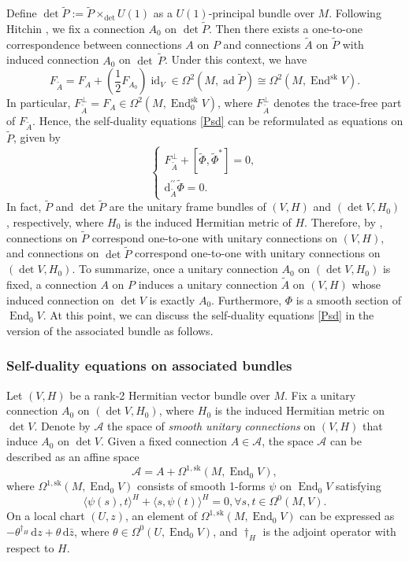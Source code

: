 \documentclass[a4paper]{amsart}
\theoremstyle{definition}
\theoremstyle{remark}
\numberwithin{equation}{section}
\begin{document}
Define $\det \tilde{P} := \tilde P \times_{\det} U(1)$ as a $U(1)$-principal bundle over $M$. Following Hitchin \cite[Section 2]{hitchin1987self}, we fix a connection $A_0$ on $\det \tilde{P}$. Then there exists a one-to-one correspondence between connections $A$ on $P$ and connections $\tilde{A}$ on $\tilde{P}$ with induced connection $A_0$ on $\det\,\tilde{P}$. Under this context, we have
\[
F_{\tilde{A}} = F_A + \left(\frac{1}{2} F_{A_0}\right) \operatorname{id}_V \in \Omega^2(M, \operatorname{ad} \tilde{P}) \cong \Omega^2(M, \operatorname{End}^{\text{sk}} V).
\]
In particular, $F_{\tilde{A}}^\perp = F_A \in \Omega^2(M, \operatorname{End}_0^{\text{sk}} V)$, where $F_{\tilde{A}}^\perp$ denotes the trace-free part of $F_{\tilde{A}}$. Hence, the self-duality equations \eqref{Psd} can be reformulated as equations on $\tilde{P}$, given by
\begin{equation*}
\begin{cases}
F_{\tilde{A}}^\perp + [\tilde{\Phi}, \tilde{\Phi}^*] = 0, \\
\mathrm{d}_{\tilde{A}}^{\prime\prime} \tilde{\Phi} = 0.
\end{cases}
\end{equation*}
In fact, $\tilde{P}$ and $\det \tilde{P}$ are the unitary frame bundles of $(V, H)$ and $(\det V, H_0)$, respectively, where $H_0$ is the induced Hermitian metric of $H$. Therefore, by \cite[Definition~2.1.8]{joyce2000compact}, connections on $\tilde{P}$ correspond one-to-one with unitary connections on $(V, H)$, and connections on $\det \tilde{P}$ correspond one-to-one with unitary connections on $(\det V, H_0)$. To summarize, once a unitary connection $A_0$ on $(\det V, H_0)$ is fixed, a connection $A$ on $P$ induces a unitary connection $\tilde{A}$ on $(V, H)$ whose induced connection on $\det V$ is exactly $A_0$. Furthermore, $\Phi$ is a smooth section of $\operatorname{End}_0 V$. At this point, we can discuss the self-duality equations \eqref{Psd} in the version of the associated
bundle as follows.

\subsubsection{Self-duality equations on associated bundles}
Let $(V, H)$ be a rank-2 Hermitian vector bundle over $M$. Fix a unitary connection $A_0$ on $(\det V, H_0)$, where $H_0$ is the induced Hermitian metric on $\det V$. Denote by $\mathscr{A}$ the space of \textit{smooth unitary connections} on $(V, H)$ that induce $A_0$ on $\det V$. Given a fixed connection $A \in \mathscr{A}$, the space $\mathscr{A}$ can be described as an affine space 
\[
\mathscr{A} = A + \Omega^{1, \text{sk}}(M, \operatorname{End}_0 V),
\]
where $\Omega^{1, \text{sk}}(M, \operatorname{End}_0 V)$ consists of smooth 1-forms $\psi$ on $\operatorname{End}_0 V$ satisfying
\[
\langle \psi(s), t \rangle^{H} + \langle s, \psi(t) \rangle^{H} = 0,  \forall s, t \in \Omega^0(M, V).
\] 
On a local chart $(U, z)$, an element of $\Omega^{1, \text{sk}}(M, \operatorname{End}_0 V)$ can be expressed as
$-\theta^{\dagger_H} \, \mathrm{d}z + \theta \, \mathrm{d}\bar{z}$,
where $\theta \in \Omega^0(U, \operatorname{End}_0 V)$, and $\dagger_H$ is the adjoint operator with respect to $H$.
\end{document}
